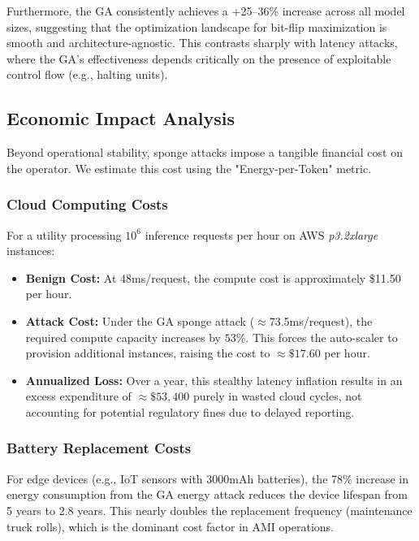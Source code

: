 Furthermore, the GA consistently achieves a +25--36\% increase across all model sizes, suggesting that the optimization landscape for bit-flip maximization is smooth and architecture-agnostic. This contrasts sharply with latency attacks, where the GA's effectiveness depends critically on the presence of exploitable control flow (e.g., halting units).

\subsection{Economic Impact Analysis}
Beyond operational stability, sponge attacks impose a tangible financial cost on the operator. We estimate this cost using the "Energy-per-Token" metric.

\subsubsection{Cloud Computing Costs}
For a utility processing $10^6$ inference requests per hour on AWS \textit{p3.2xlarge} instances:
\begin{itemize}
    \item \textbf{Benign Cost:} At 48ms/request, the compute cost is approximately \$11.50 per hour.
    \item \textbf{Attack Cost:} Under the GA sponge attack ($\approx$73.5ms/request), the required compute capacity increases by $53\%$. This forces the auto-scaler to provision additional instances, raising the cost to $\approx \$17.60$ per hour.
    \item \textbf{Annualized Loss:} Over a year, this stealthy latency inflation results in an excess expenditure of $\approx \$53,400$ purely in wasted cloud cycles, not accounting for potential regulatory fines due to delayed reporting.
\end{itemize}

\subsubsection{Battery Replacement Costs}
For edge devices (e.g., IoT sensors with 3000mAh batteries), the 78\% increase in energy consumption from the GA energy attack reduces the device lifespan from 5 years to 2.8 years. This nearly doubles the replacement frequency (maintenance truck rolls), which is the dominant cost factor in AMI operations.
